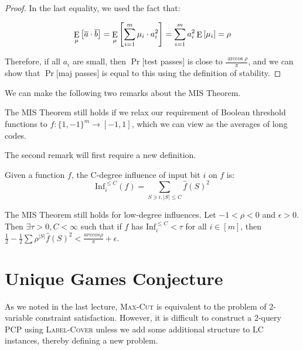 \documentclass[12pt]{article}
\begin{document}
\begin{proof}
In the last equality, we used the fact that:

\begin{equation}
\mathop{\rm {E}}_\mu\left[\overline{a}\cdot\overline{b} \right] = 
\mathop{\rm {E}}_\mu\left[\sum_{i=1}^m{\mu_i\cdot a_i^2}\right]
 = \sum_{i=1}^m{a_i^2\mathop{\rm {E}}\left[\mu_i\right]}
 = \rho
\end{equation}

Therefore, if all $a_i$ are small, then $\Pr[$test passes$]$ is close to
$\frac{\arccos{\rho}}{\pi}$, and we can show that $\Pr[$maj passes$]$ is
equal to this using the definition of stability.
\end{proof}

We can make the following two remarks about the MIS Theorem.

\begin{remark}
The MIS Theorem still holds if we relax our requirement of Boolean
threshold functions to $f: \{1,-1\}^m \rightarrow [-1,1]$, which we can
view as the averages of long codes.
\end{remark}

The second remark will first require a new definition.

\begin{definition}
Given a function $f$, the C-degree influence of input bit $i$ on $f$ is:
\begin{displaymath}
\textrm{Inf}_i^{\le C}(f) = \sum_{S \ni i, |S| \le C}{\hat{f}(S)^2}
\end{displaymath}
\end{definition}

\begin{remark}
The MIS Theorem still holds for low-degree influences. Let $-1 < \rho < 0$
and $\epsilon > 0$. Then $\exists \tau > 0, C < \infty$ such that
if $f$ has $\textrm{Inf}_i^{\le C} < \tau$ for all $i \in [m]$, then
$\frac{1}{2} - \frac{1}{2}\sum{\rho^{|S|}\hat{f}(S)^2} < \frac{arccos{\rho}}{\pi} + \epsilon$.
\end{remark}

\section{Unique Games Conjecture}

As we noted in the last lecture, \textsc{Max-Cut} is equivalent to
the problem of 2-variable constraint satisfaction. However, it is
difficult to construct a 2-query PCP using \textsc{Label-Cover} unless
we add some additional structure to LC instances, thereby defining a
new problem.
\end{document}
